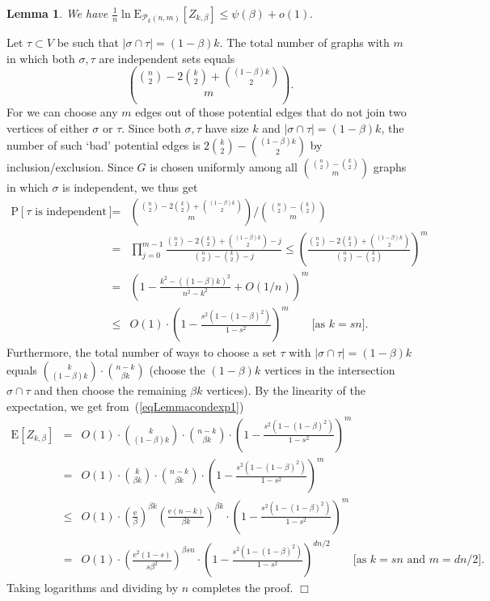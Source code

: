 \documentclass[a4paper,10pt]{article}
\makeatletter
\newtheorem{lemma}{Lemma}\renewcommand{\thelemma}{\arabic{lemma}}
\newenvironment{proof}{\noindent{\bf Proof\@:}}{\hfill $\Box$\\}
\newcommand\cP{\mathcal{P}}
\newcommand\eul{\mathrm{e}}
\newcommand\Erw{\mathrm{E}}
\newcommand\pr{\mathrm{P}}
\newcommand{\bink}[2] {{{#1}\choose {#2}}}
\newcommand\bc[1]{\left({#1}\right)}
\newcommand\bcfr[2]{\bc{\frac{#1}{#2}}}
\newcommand\brk[1]{\left\lbrack{#1}\right\rbrack}
\makeatother
\begin{document}
\begin{lemma}\label{Lemma_condexp}
We have
	$\frac1n\ln\Erw_{\cP_k(n,m)}\brk{Z_{k,\beta}}\leq\psi(\beta)+o(1).$
\end{lemma}
\begin{proof}
Let $\tau\subset V$ be such that $|\sigma\cap\tau|=(1-\beta)k$. 
The total number of graphs with $m$ in which both $\sigma,\tau$
are independent sets equals
	$$\bink{\bink n2-2\bink k2+\bink{(1-\beta)k}2}{m}.$$
For we can choose any $m$ edges out of those potential edges that
do not join two vertices of either $\sigma$ or $\tau$.
Since both $\sigma,\tau$ have size $k$ and $|\sigma\cap\tau|=(1-\beta)k$,
the number of such `bad' potential edges is $2\bink k2-\bink{(1-\beta)k}2$
by inclusion/exclusion.
Since $G$ is chosen uniformly among all $\bink{\bink n2-\bink k2}{m}$
graphs in which $\sigma$ is independent, we thus get
	\begin{eqnarray}
	\pr\brk{\tau\mbox{ is independent}}&=&\bink{\bink n2-2\bink k2+\bink{(1-\beta)k}2}{m}/\bink{\bink n2-\bink k2}{m}\nonumber\\
		&=&\prod_{j=0}^{m-1}\frac{\bink n2-2\bink k2+\bink{(1-\beta)k}2-j}{\bink n2-\bink k2-j}
			\leq\bcfr{\bink n2-2\bink k2+\bink{(1-\beta)k}2}{\bink n2-\bink k2}^m\nonumber\\
		&=&\bc{1-\frac{k^2-((1-\beta)k)^2}{n^2-k^2}+O(1/n)}^m\nonumber\\
		&\leq&O\bc{1}\cdot\bc{1-\frac{s^2(1-(1-\beta)^2)}{1-s^2}}^m\qquad\mbox{[as $k=sn$]}.
			\label{eqLemmacondexp1}
	\end{eqnarray}
Furthermore, the total number of ways to choose a set $\tau$ with
$|\sigma\cap\tau|=(1-\beta)k$ equals 	$\bink{k}{(1-\beta)k}\cdot\bink{n-k}{\beta k}$
(choose the $(1-\beta)k$ vertices in the intersection $\sigma\cap\tau$
and then choose the remaining $\beta k$ vertices).
By the linearity of the expectation, we get from~(\ref{eqLemmacondexp1})
	\begin{eqnarray*}
	\Erw\brk{Z_{k,\beta}}&=&O(1)\cdot\bink{k}{(1-\beta)k}\cdot\bink{n-k}{\beta k}\cdot\bc{1-\frac{s^2(1-(1-\beta)^2)}{1-s^2}}^m\\
		&=&O(1)\cdot\bink{k}{\beta k}\cdot\bink{n-k}{\beta k}\cdot\bc{1-\frac{s^2(1-(1-\beta)^2)}{1-s^2}}^m\\
		&\leq&O(1)\cdot\bcfr{\eul}{\beta}^{\beta k}\bcfr{\eul(n-k)}{\beta k}^{\beta k}\cdot\bc{1-\frac{s^2(1-(1-\beta)^2)}{1-s^2}}^m\\
		&=&O(1)\cdot\bcfr{\eul^2(1-s)}{s\beta^2}^{\beta sn}\cdot\bc{1-\frac{s^2(1-(1-\beta)^2)}{1-s^2}}^{dn/2}
			\qquad\mbox{[as $k=sn$ and $m=dn/2$]}.
	\end{eqnarray*}
Taking logarithms and dividing by $n$ completes the proof.
\end{proof}
\end{document}
